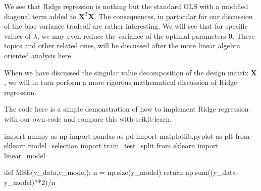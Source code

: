 \documentclass[%
oneside,                 %
final,                   %
10pt]{article}
\begin{document}
We see that Ridge regression is nothing but the standard OLS with a
modified diagonal term added to $\bm{X}^T\bm{X}$. The consequences, in
particular for our discussion of the bias-variance tradeoff are rather
interesting. We will see that for specific values of $\lambda$, we may
even reduce the variance of the optimal parameters $\bm{\theta}$. These topics and other related ones, will be discussed after the more linear algebra oriented analysis here.

When we have discussed the singular value decomposition of the design
matrix $\bm{X}$, we will in turn perform a more rigorous mathematical
discussion of Ridge regression.

The code here is a simple demonstration of how to implement Ridge regression with our own code and compare this with scikit-learn.




































































\bpycod
import numpy as np
import pandas as pd
import matplotlib.pyplot as plt
from sklearn.model_selection import train_test_split
from sklearn import linear_model

def MSE(y_data,y_model):
    n = np.size(y_model)
    return np.sum((y_data-y_model)**2)/n
\end{document}
